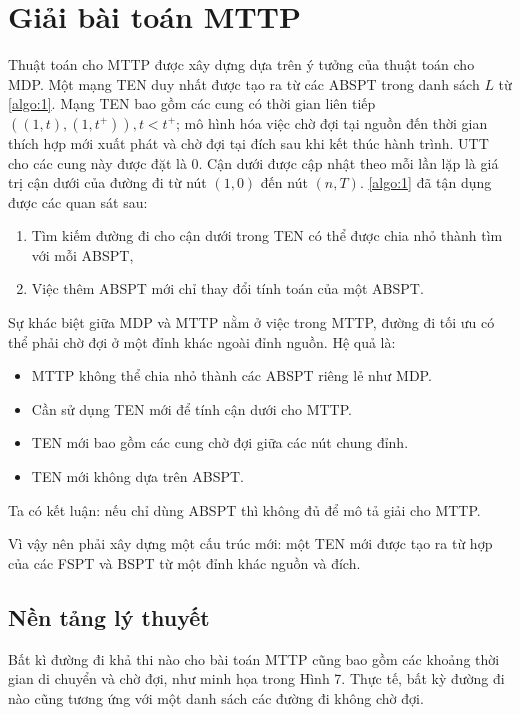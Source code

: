 \documentclass[../main.tex]{subfiles}
\begin{document}
\chapter{Giải bài toán MTTP}\label{giux1ea3i-buxe0i-touxe1n-mttp}

Thuật toán cho MTTP được xây dựng dựa trên ý tưởng của thuật toán cho
MDP. Một mạng TEN duy nhất được tạo ra từ các ABSPT trong danh sách
\(L\) từ \autoref{algo:1}. Mạng TEN bao gồm các cung có thời gian
liên tiếp \(((1, t), (1, t^+)), t<t^+\); mô hình hóa việc chờ đợi tại
nguồn đến thời gian thích hợp mới xuất phát và chờ đợi tại đích sau khi
kết thúc hành trình. UTT cho các cung này được đặt là 0. Cận dưới được
cập nhật theo mỗi lần lặp là giá trị cận dưới của đường đi từ nút
\((1,0)\) đến nút \((n, T)\). \autoref{algo:1} đã tận dụng được các quan sát
sau:

\begin{enumerate}
\def\labelenumi{\arabic{enumi}.}
\tightlist
\item
  Tìm kiếm đường đi cho cận dưới trong TEN có thể được chia nhỏ thành
  tìm với mỗi ABSPT,
\item
  Việc thêm ABSPT mới chỉ thay đổi tính toán của một ABSPT.
\end{enumerate}

Sự khác biệt giữa MDP và MTTP nằm ở việc trong MTTP, đường đi tối ưu có
thể phải chờ đợi ở một đỉnh khác ngoài đỉnh nguồn. Hệ quả là:

\begin{itemize}
\tightlist
\item
  MTTP không thể chia nhỏ thành các ABSPT riêng lẻ như MDP.
\item
  Cần sử dụng TEN mới để tính cận dưới cho MTTP.
\item
  TEN mới bao gồm các cung chờ đợi giữa các nút chung đỉnh.
\item
  TEN mới không dựa trên ABSPT.
\end{itemize}

Ta có kết luận: nếu chỉ dùng ABSPT thì không đủ để mô tả giải cho MTTP.

Vì vậy nên phải xây dựng một cấu trúc mới: một TEN mới được tạo ra từ
hợp của các FSPT và BSPT từ một đỉnh khác nguồn và đích. 

\section{Nền tảng lý thuyết}\label{nux1ec1n-tux1ea3ng-luxfd-thuyux1ebft}

Bất kì đường đi khả thi nào cho bài toán MTTP cũng bao gồm các khoảng
thời gian di chuyển và chờ đợi, như minh họa trong Hình 7. Thực tế, bất
kỳ đường đi nào cũng tương ứng với một danh sách các đường đi không chờ
đợi.
\end{document}
